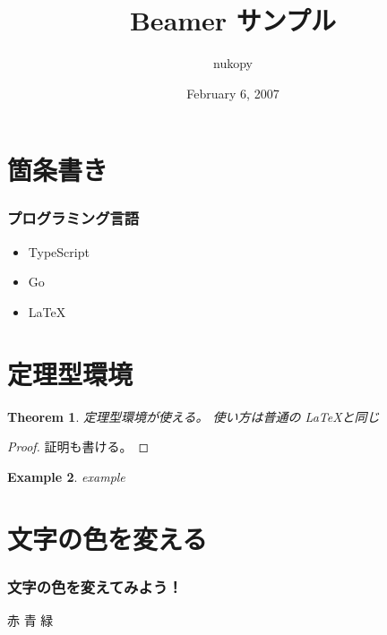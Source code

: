 \documentclass[dvipdfmx,cjk]{beamer}
\newtheorem{thm}{Theorem}[section]
\theoremstyle{example}
\newtheorem{exam}[thm]{Example}
\begin{document}
\title[Sample of Beamer]{Beamer サンプル}
\author[nukopy]{nukopy}
\date{February 6, 2007}

\begin{frame}
\titlepage
\end{frame}

\begin{frame}
\tableofcontents
\end{frame}

\section{箇条書き}
\begin{frame}
\frametitle{プログラミング言語} %

\begin{itemize}
\item TypeScript\pause %
\item Go\pause
\item LaTeX
\end{itemize}
\end{frame}

\section{定理型環境}
\begin{frame} %
\begin{thm}
定理型環境が使える。
使い方は普通の \LaTeX と同じ
\end{thm}
\pause

\begin{proof}
証明も書ける。
\end{proof}
\pause

\begin{exam}
example
\end{exam}
\end{frame}

\section{文字の色を変える}             %
\begin{frame}
\frametitle{文字の色を変えてみよう！}
{\color{red}赤}\pause
{\color{blue}青}\pause
{\color{green}緑}
\end{frame}
\end{document}
